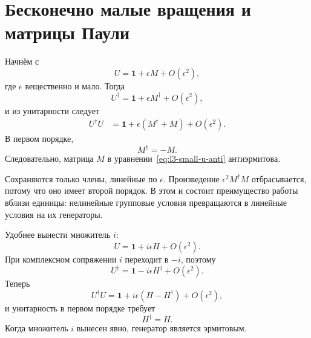 \section{Бесконечно малые вращения и матрицы Паули}

\begin{classroomqa}
\end{classroomqa}

Начнём с
\begin{equation}
U=\boldsymbol 1+\epsilon M+O(\epsilon^2),
\label{eq:l3-small-u-anti}
\end{equation}
где \(\epsilon\) вещественно и мало. Тогда
\begin{equation}
U^\dagger=\boldsymbol 1+\epsilon M^\dagger+O(\epsilon^2),
\end{equation}
и из унитарности следует
\begin{align}
U^\dagger U
 &=\boldsymbol 1+\epsilon(M^\dagger+M)+O(\epsilon^2).
\end{align}
В первом порядке,
\begin{equation}
M^\dagger=-M.
\end{equation}
Следовательно, матрица \(M\) в уравнении~\eqref{eq:l3-small-u-anti} антиэрмитова.

Сохраняются только члены, линейные по \(\epsilon\). Произведение \(\epsilon^2M^\dagger M\) отбрасывается, потому что оно имеет второй порядок. В этом и состоит преимущество работы вблизи единицы: нелинейные групповые условия превращаются в линейные условия на их генераторы.

Удобнее вынести множитель \(i\):
\begin{equation}
U=\boldsymbol 1+i\epsilon H+O(\epsilon^2).
\label{eq:l3-small-u-herm}
\end{equation}
При комплексном сопряжении \(i\) переходит в \(-i\), поэтому
\begin{equation}
U^\dagger=\boldsymbol 1-i\epsilon H^\dagger+O(\epsilon^2).
\end{equation}
Теперь
\begin{equation}
U^\dagger U
=\boldsymbol 1+i\epsilon(H-H^\dagger)+O(\epsilon^2),
\end{equation}
и унитарность в первом порядке требует
\begin{equation}
H^\dagger=H.
\end{equation}
Когда множитель \(i\) вынесен явно, генератор является эрмитовым.

